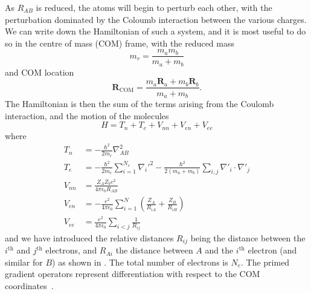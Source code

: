 As $R_{AB}$ is reduced, the atoms will begin to perturb each other, with the
perturbation dominated by the Coloumb interaction between the various charges.
We can write down the Hamiltonian of such a system, and it is most useful to do
so in the centre of mass (COM) frame, with the reduced mass
%
\begin{equation}
  m_r = \frac{m_a m_b}{m_a + m_b}
\end{equation}
%
and COM location
%
\begin{equation}
  \mathbf{R}_\text{COM} = \frac{m_a \mathbf{R}_a + m_b \mathbf{R}_b}{m_a+m_b}.
\end{equation}
%
The Hamiltonian is then the sum of the terms arising from the Coulomb
interaction, and the motion of the molecules
%
\begin{equation}
  H = T_n + T_e + V_{nn} + V_{en} + V_{ee}
\end{equation}
%
where
%
\begin{align}
  T_n &= -\frac{\hbar^2}{2m_r}\nabla_{AB}^2\\
  T_e &= -\frac{\hbar^2}{2 m_e}\sum_{i=1}^{N_e} \nabla_i'^2 -
  \frac{\hbar^2}{2(m_a + m_b)}\sum_{i, j} \nabla'_i \cdot \nabla'_j \\
  V_{nn} &= \frac{Z_A Z_b e^2}{4\pi\epsilon_0 R_{AB}} \\
  V_{en} &= - \frac{e^2}{4\pi\epsilon_0}\sum_{i=1}^N \left(\frac{Z_A}{R_{iA}} + \frac{Z_B}{R_{iB}}\right) \\
  V_{ee} &= \frac{e^2}{4\pi\epsilon_0}\sum_{i<j} \frac{1}{R_{ij}}
\end{align}
%
and we have introduced the relative distances $R_{ij}$ being the distance
between the $i^\text{th}$ and $j^\text{th}$ electrons, and $R_{Ai}$ the
distance between $A$ and the $i^\text{th}$ electron (and similar for $B$) as
shown in . The
total number of electrons is $N_e$. The primed gradient operators represent
differentiation with respect to the COM coordinates~\cite{}.

